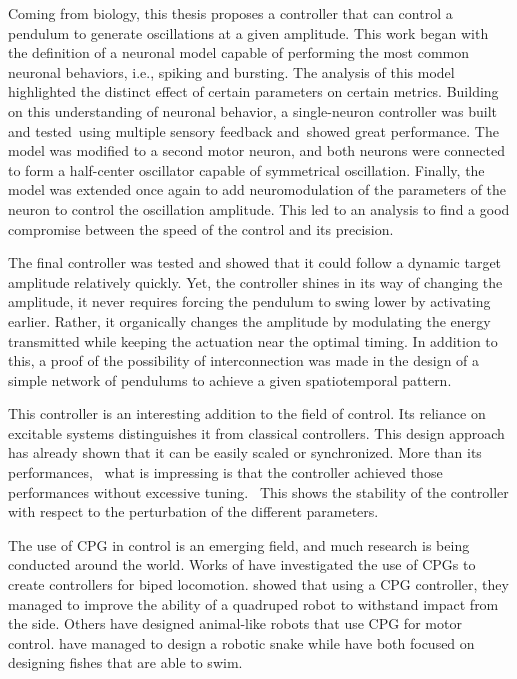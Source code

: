 Coming from biology, this thesis proposes a controller that can control a pendulum to generate oscillations at a given amplitude.
This work began with the definition of a neuronal model capable of performing the most common neuronal behaviors, i.e., spiking and bursting.
The analysis of this model highlighted the distinct effect of certain parameters on certain metrics.
Building on this understanding of neuronal behavior, a single-neuron controller was built and tested using multiple sensory feedback and showed great performance.
The model was modified to a second motor neuron, and both neurons were connected to form a half-center oscillator capable of symmetrical oscillation.
Finally, the model was extended once again to add neuromodulation of the parameters of the neuron to control the oscillation amplitude.
This led to an analysis to find a good compromise between the speed of the control and its precision. 

The final controller was tested and showed that it could follow a dynamic target amplitude relatively quickly.
Yet, the controller shines in its way of changing the amplitude, it never requires forcing the pendulum to swing lower by activating earlier.
Rather, it organically changes the amplitude by modulating the energy transmitted while keeping the actuation near the optimal timing.
In addition to this, a proof of the possibility of interconnection was made in the design of a simple network of pendulums to achieve a given spatiotemporal pattern.

This controller is an interesting addition to the field of control.
Its reliance on excitable systems distinguishes it from classical controllers.
This design approach has already shown that it can be easily scaled or synchronized.
More than its performances,  what is impressing is that the controller achieved those performances without excessive tuning. 
This shows the stability of the controller with respect to the perturbation of the different parameters.

The use of CPG in control is an emerging field, and much research is being conducted around the world.
Works of \citet{related2,related3,related4,related5} have investigated the use of CPGs to create controllers for biped locomotion. \citet{related1} showed that using a CPG controller, they managed to improve the ability of a quadruped robot to withstand impact from the side. Others have designed animal-like robots that use CPG for motor control. \citet{related6} have managed to design a robotic snake while \citet{related7,related8} have both focused on designing fishes that are able to swim.

